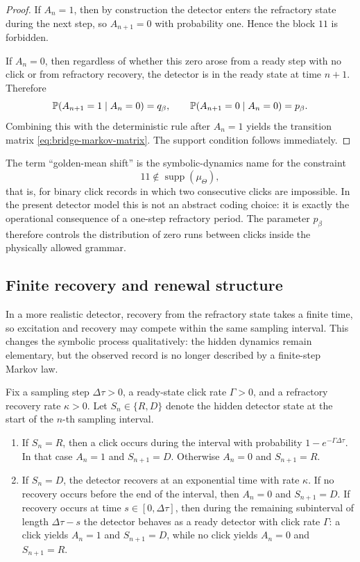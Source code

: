 \begin{proof}
If $A_n=1$, then by construction the detector enters the refractory state during the next step, so $A_{n+1}=0$ with probability one. Hence the block $11$ is forbidden.

If $A_n=0$, then regardless of whether this zero arose from a ready step with no click or from refractory recovery, the detector is in the ready state at time $n+1$. Therefore
\[
\mathbb{P}(A_{n+1}=1\mid A_n=0)=q_\beta,
\qquad
\mathbb{P}(A_{n+1}=0\mid A_n=0)=p_\beta.
\]
Combining this with the deterministic rule after $A_n=1$ yields the transition matrix \eqref{eq:bridge-markov-matrix}. The support condition follows immediately.
\end{proof}

\begin{remark}\label{rem:golden-mean-primer}
The term ``golden-mean shift'' is the symbolic-dynamics name for the constraint
\[
11\notin\operatorname{supp}(\mu_\Theta),
\]
that is, for binary click records in which two consecutive clicks are impossible. In the present detector model this is not an abstract coding choice: it is exactly the operational consequence of a one-step refractory period. The parameter $p_\beta$ therefore controls the distribution of zero runs between clicks inside the physically allowed grammar.
\end{remark}

\subsection{Finite recovery and renewal structure}

In a more realistic detector, recovery from the refractory state takes a finite time, so excitation and recovery may compete within the same sampling interval. This changes the symbolic process qualitatively: the hidden dynamics remain elementary, but the observed record is no longer described by a finite-step Markov law.

\begin{definition}\label{def:finite-recovery}
Fix a sampling step $\Delta\tau>0$, a ready-state click rate $\Gamma>0$, and a refractory recovery rate $\kappa>0$. Let $S_n\in\{R,D\}$ denote the hidden detector state at the start of the $n$-th sampling interval.
\begin{enumerate}[label=(\roman*),leftmargin=*,itemsep=2pt]
  \item If $S_n=R$, then a click occurs during the interval with probability $1-e^{-\Gamma\Delta\tau}$. In that case $A_n=1$ and $S_{n+1}=D$. Otherwise $A_n=0$ and $S_{n+1}=R$.
  \item If $S_n=D$, the detector recovers at an exponential time with rate $\kappa$. If no recovery occurs before the end of the interval, then $A_n=0$ and $S_{n+1}=D$. If recovery occurs at time $s\in[0,\Delta\tau]$, then during the remaining subinterval of length $\Delta\tau-s$ the detector behaves as a ready detector with click rate $\Gamma$: a click yields $A_n=1$ and $S_{n+1}=D$, while no click yields $A_n=0$ and $S_{n+1}=R$.
\end{enumerate}
\end{definition}

